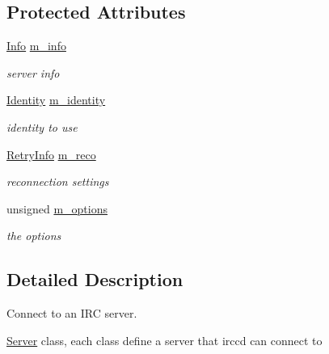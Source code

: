 \subsection*{Protected Attributes}
\begin{DoxyCompactItemize}
\item 
\hypertarget{a00055_a2924cfdf489bbab61d07af072bf0e4c2}{\hyperlink{a00031}{Info} \hyperlink{a00055_a2924cfdf489bbab61d07af072bf0e4c2}{m\-\_\-info}}\label{a00055_a2924cfdf489bbab61d07af072bf0e4c2}

\begin{DoxyCompactList}\small\item\em server info \end{DoxyCompactList}\item 
\hypertarget{a00055_a2559b7f5887c23fe50fa9c85e352ff4f}{\hyperlink{a00029}{Identity} \hyperlink{a00055_a2559b7f5887c23fe50fa9c85e352ff4f}{m\-\_\-identity}}\label{a00055_a2559b7f5887c23fe50fa9c85e352ff4f}

\begin{DoxyCompactList}\small\item\em identity to use \end{DoxyCompactList}\item 
\hypertarget{a00055_a6d1f044c785d56b9d582fd915951d31a}{\hyperlink{a00053}{Retry\-Info} \hyperlink{a00055_a6d1f044c785d56b9d582fd915951d31a}{m\-\_\-reco}}\label{a00055_a6d1f044c785d56b9d582fd915951d31a}

\begin{DoxyCompactList}\small\item\em reconnection settings \end{DoxyCompactList}\item 
\hypertarget{a00055_acb63efaaf97d387e5b7ebde67e4922c2}{unsigned \hyperlink{a00055_acb63efaaf97d387e5b7ebde67e4922c2}{m\-\_\-options}}\label{a00055_acb63efaaf97d387e5b7ebde67e4922c2}

\begin{DoxyCompactList}\small\item\em the options \end{DoxyCompactList}\end{DoxyCompactItemize}


\subsection{Detailed Description}
Connect to an I\-R\-C server. 

\hyperlink{a00055}{Server} class, each class define a server that irccd can connect to 

